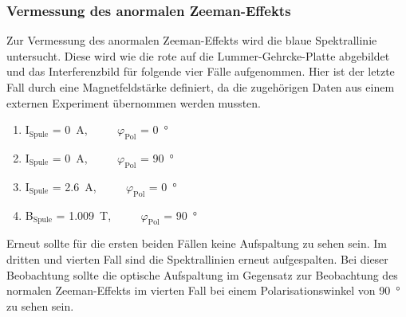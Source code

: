             
        \subsubsection*{Vermessung des anormalen Zeeman-Effekts}
            Zur Vermessung des anormalen Zeeman-Effekts wird die blaue Spektrallinie untersucht. Diese wird wie die rote auf die Lummer-Gehrcke-Platte abgebildet und das Interferenzbild für folgende vier Fälle 
            aufgenommen. Hier ist der letzte Fall durch eine Magnetfeldstärke definiert, da die zugehörigen Daten aus einem externen Experiment übernommen werden mussten.
            
            \begin{enumerate}
                \item I$_{\text{Spule}}$ = \SI{0}{\ampere}, $\qquad$    $\varphi_{\text{Pol}}$ = \SI{0}{\degree}
                \item I$_{\text{Spule}}$ = \SI{0}{\ampere}, $\qquad$    $\varphi_{\text{Pol}}$ = \SI{90}{\degree}
                \item I$_{\text{Spule}}$ = \SI{2.6}{\ampere}, $\qquad$    $\varphi_{\text{Pol}}$ = \SI{0}{\degree}
                \item B$_{\text{Spule}}$ = \SI{1.009}{\tesla}, $\qquad$    $\varphi_{\text{Pol}}$ = \SI{90}{\degree}
            \end{enumerate}

            Erneut sollte für die ersten beiden Fällen keine Aufspaltung zu sehen sein. Im dritten und vierten Fall sind die Spektrallinien erneut aufgespalten. Bei dieser Beobachtung sollte die optische 
            Aufspaltung im Gegensatz zur Beobachtung des normalen Zeeman-Effekts im vierten Fall bei einem Polarisationswinkel von \SI{90}{\degree} zu sehen sein.
        
